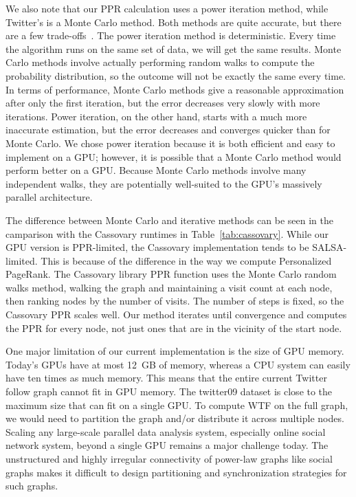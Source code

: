 \documentclass{article}
\renewcommand{\cite}[1]{}
\begin{document}
We also note that our PPR calculation uses a power iteration method, while Twitter's is a Monte Carlo method. Both methods are quite accurate, but there are a few trade-offs~\cite{Avrachenkov:2007:MCM}. The power iteration method is deterministic. Every time the algorithm runs on the same set of data, we will get the same results. Monte Carlo methods involve actually performing random walks to compute the probability distribution, so the outcome will not be exactly the same every time. In terms of performance, Monte Carlo methods give a reasonable approximation after only the first iteration, but the error decreases very slowly with more iterations. Power iteration, on the other hand, starts with a much more inaccurate estimation, but the error decreases and converges quicker than for Monte Carlo. We chose power iteration because it is both efficient and easy to implement on a GPU; however, it is possible that a Monte Carlo method would perform better on a GPU\@. Because Monte Carlo methods involve many independent walks, they are potentially well-suited to the GPU's massively parallel architecture.

The difference between Monte Carlo and iterative methods can be seen in the camparison with the Cassovary runtimes in Table~\ref{tab:cassovary}. While our GPU version is PPR-limited, the Cassovary implementation tends to be SALSA-limited. This is because of the difference in the way we compute Personalized PageRank. The Cassovary library PPR function uses the Monte Carlo random walks method, walking the graph and maintaining a visit count at each node, then ranking nodes by the number of visits. The number of steps is fixed, so the Cassovary PPR scales well. Our method iterates until convergence and computes the PPR for every node, not just ones that are in the vicinity of the start node.

One major limitation of our current implementation is the size of GPU memory. Today's GPUs have at most 12~GB of memory, whereas a CPU system can easily have ten times as much memory. This means that the entire current Twitter follow graph cannot fit in GPU memory. The twitter09 dataset is close to the maximum size that can fit on a single GPU\@. To compute WTF on the full graph, we would need to partition the graph and/or distribute it across multiple nodes. Scaling any large-scale parallel data analysis system, especially online social network system, beyond a single GPU remains a major challenge today. The unstructured and highly irregular connectivity of power-law graphs like social graphs makes it difficult to design partitioning and synchronization strategies for such graphs.
\end{document}
